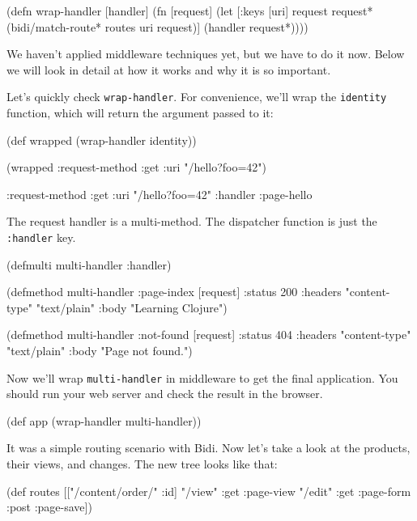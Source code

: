 \else

\begin{clojure}
(defn wrap-handler [handler]
  (fn [request]
    (let [{:keys [uri]} request
          request* (bidi/match-route* routes uri request)]
      (handler request*))))
\end{clojure}

\fi

We haven't applied middleware techniques yet, but we have to do it now. Below we will look in detail at how it works and why it is so important.

Let's quickly check \verb|wrap-handler|. For convenience, we'll wrap the \verb|identity| function, which will return the argument passed to it:

\begin{clojure}
(def wrapped (wrap-handler identity))

(wrapped {:request-method :get
          :uri "/hello?foo=42"})

{:request-method :get
 :uri "/hello?foo=42"
 :handler :page-hello}
\end{clojure}


The request handler is a multi-method. The dispatcher function is just the \verb|:handler| key.

\begin{clojure}
(defmulti multi-handler
  :handler)

(defmethod multi-handler :page-index
  [request]
  {:status 200
   :headers {"content-type" "text/plain"}
   :body "Learning Clojure"})

(defmethod multi-handler :not-found
  [request]
  {:status 404
   :headers {"content-type" "text/plain"}
   :body "Page not found."})
\end{clojure}

Now we'll wrap \verb|multi-handler| in middleware to get the final application. You should run your web server and check the result in the browser.

\begin{clojure}
(def app (wrap-handler multi-handler))
\end{clojure}

It was a simple routing scenario with Bidi. Now let's take a look at the products, their views, and changes. The new tree looks like that:

\ifx\DEVICETYPE\MOBILE

\begin{clojure}
(def routes
  [["/content/order/" :id]
   {"/view" {:get  :page-view}
    "/edit" {:get  :page-form
             :post :page-save}}])
\end{clojure}

